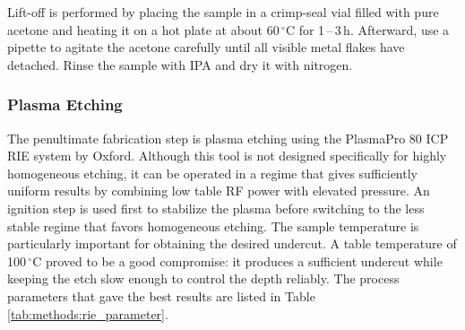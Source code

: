         Lift-off is performed by placing the sample in a crimp-seal vial filled with pure acetone and heating it on a hot plate at about 60\,$^\circ$C for 1\,--\,3\,h. Afterward, use a pipette to agitate the acetone carefully until all visible metal flakes have detached. Rinse the sample with IPA and dry it with nitrogen.

    \subsubsection*{Plasma Etching}
        The penultimate fabrication step is plasma etching using the PlasmaPro 80 ICP RIE system by Oxford. Although this tool is not designed specifically for highly homogeneous etching, it can be operated in a regime that gives sufficiently uniform results by combining low table RF power with elevated pressure. An ignition step is used first to stabilize the plasma before switching to the less stable regime that favors homogeneous etching. The sample temperature is particularly important for obtaining the desired undercut. A table temperature of 100\,$^\circ$C proved to be a good compromise: it produces a sufficient undercut while keeping the etch slow enough to control the depth reliably. The process parameters that gave the best results are listed in Table \ref{tab:methods:rie_parameter}.
